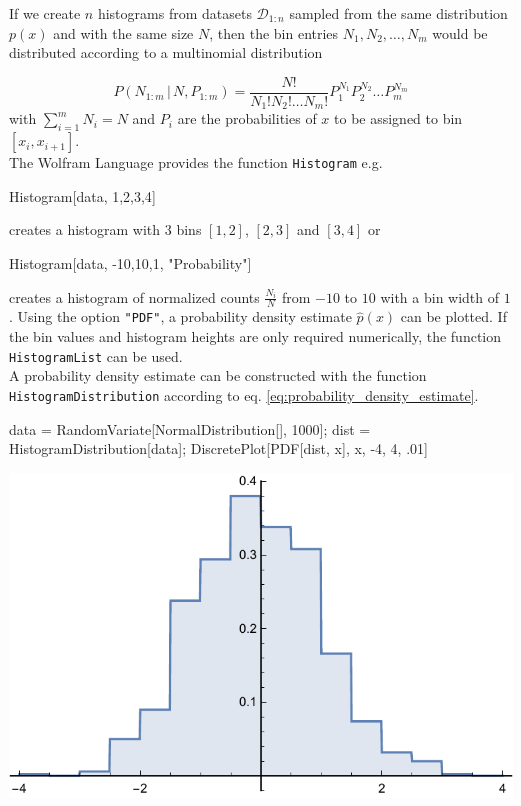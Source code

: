 \documentclass{tstextbook}
\begin{document}
If we create $n$ histograms from datasets $\mathcal{D}_{1:n}$ sampled from the same distribution $p(x)$ and with the same size $N$, then the bin entries $N_1,N_2,\ldots,N_m$ would be distributed according to a multinomial distribution

  \begin{equation}
    P(N_{1:m}\,\vert\, N,P_{1:m})=\frac{N!}{N_1!N_2!\ldots N_m!}P_1^{N_1}P_2^{N_2}\ldots P_m^{N_m}
  \end{equation}
with $\sum_{i=1}^m N_i=N$ and $P_i$ are the probabilities of $x$ to be assigned to bin $[x_i,x_{i+1}]$.\\

The Wolfram Language provides the function \texttt{Histogram} e.g. 
\begin{mathematica}
Histogram[data, {{1,2,3,4}}]
\end{mathematica}
creates a histogram with 3 bins $[1,2]$, $[2,3]$ and $[3,4]$ or 
\begin{mathematica}
Histogram[data, {-10,10,1}, "Probability"]
\end{mathematica}
creates a histogram of normalized counts $\frac{N_i}{N}$ from $-10$ to $10$ with a bin width of $1$. Using the option \texttt{"PDF"}, a probability density estimate $\hat{p}(x)$ can be plotted. If the bin values and histogram heights are only required numerically, the function \texttt{HistogramList} can be used.\\

A probability density estimate can be constructed with the function \texttt{HistogramDistribution}  according to eq. \ref{eq:probability_density_estimate}.
\begin{mathematica}
data = RandomVariate[NormalDistribution[], 1000];
dist = HistogramDistribution[data];
DiscretePlot[PDF[dist, x], {x, -4, 4, .01}]
\end{mathematica}

 \includegraphics[scale=0.9, center]{images/histogram_distribution.pdf}
\end{document}

